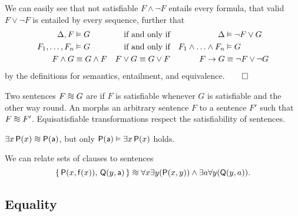 \begin{lemma}
	We can easily see that not satisfiable \( F\land\lnot F \) entails every formula,
	that valid \( F\lor\lnot F \) is entailed by every sequence, further that
	\begin{align*}
	\Delta, F&\vDash G  &\text{if and only if} && \Delta &\vDash \lnot F\lor G \\
	F_1,\ldots,F_n&\vDash G  &\text{if and only if} && F_1\land\ldots\land F_n&\vDash G\\
	F\land G&\equiv G\land F &F\lor G\equiv G\lor F && F\rightarrow G &\equiv \lnot F\lor \lnot G
	\end{align*}
	by the definitions for semantics, entailment, and equivalence.\hfill \( \qed \)
\end{lemma}

\begin{definition}
	Two sentences \( F \equisat G \) are 
	if \( F \) is satisfiable whenever \( G \) is satisfiable
	and the other way round.
	An  morphs an arbitrary sentence
	\( F \) to a sentence \( F' \) such that \( F \equisat F' \).
	Equisatisfiable transformations respect the satisfiability of sentences.
\end{definition}


\begin{example}
	\( \exists x \, \mP(x) \equisat \mP(\ma) \), but only
	\( \mathsf{P}(\mathsf{a}) \vDash \exists x \, \mathsf{P}(x) \) holds.
\end{example}

\begin{example}We can relate sets of clauses to sentences
	\[
	\{ \, \mP(x, \mf(x)), \, \mQ(y,\ma)\, \}
	\equisat \forall x\exists y(\mP(x,y)) \land \exists a\forall y(\mQ(y,a)) .
	\]
\end{example}



\subsection{Equality}

